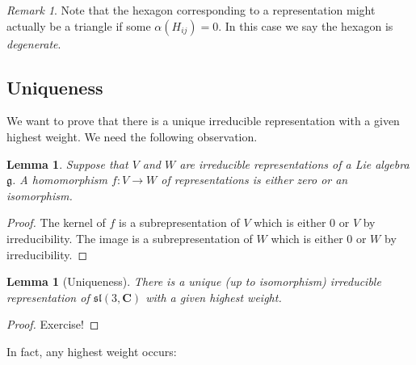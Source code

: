 \documentclass[12pt]{article}
\newcommand{\CC}{\mathbf{C}}
\newtheorem{lma}[thm]{Lemma}
\theoremstyle{definition}
\theoremstyle{check}
\theoremstyle{remark}
\newtheorem{rmk}[thm]{Remark}
\theoremstyle{TheoremNum}
\begin{document}
\begin{rmk}
Note that the hexagon corresponding to a representation might actually be a triangle if some $\alpha(H_{ij})=0$. In this case we say the hexagon is {\em degenerate}.
\end{rmk}

\subsection{Uniqueness}
We want to prove that there is a unique irreducible representation with a given highest weight. We need the following observation.
\begin{lma}
Suppose that $V$ and $W$ are irreducible representations of a Lie algebra $\mathfrak{g}$. A homomorphism $f\colon V\to W$ of representations is either zero or an isomorphism.
\end{lma}
\begin{proof}
The kernel of $f$ is a subrepresentation of $V$ which is either $0$ or $V$ by irreducibility. The image is a subrepresentation of $W$ which is either $0$ or $W$ by irreducibility.
\end{proof}

\begin{lma}[Uniqueness]
There is a unique (up to isomorphism) irreducible representation of $\mathfrak{sl}(3,\CC)$ with a given highest weight.
\end{lma}
\begin{proof}
Exercise!
\end{proof}
\begin{comment}
\begin{proof}
Suppose there were two, $V$ and $W$, with highest weight $\alpha$. Let $v$ and $w$ be vectors with weight $\alpha$. Then $v\oplus w\in V\oplus W$ is a highest weight vector for the direct sum with weight $\alpha$ and it generates an irreducible subrepresentation $U\subset V\oplus W$. The projections of $U$ to $V$ and to $W$ are nonzero maps of irreducible representations and therefore they are isomorphisms, so $V\cong U\cong W$.
\end{proof}
\end{comment}
In fact, any highest weight occurs:
\end{document}

